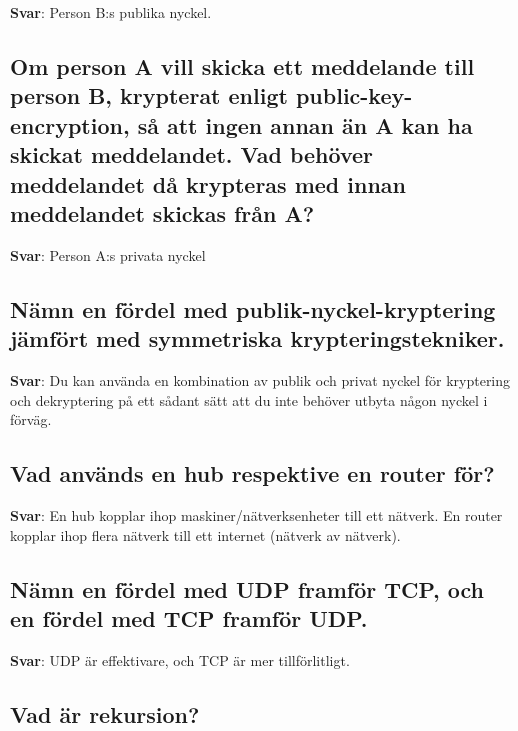 \documentclass[a4paper,11pt,oneside]{article}
\begin{document}
\begin{sloppypar}
\label{q:168:sa:sv:True}

\textbf{Svar}: Person B:s publika nyckel.



\subsection{Om person A vill skicka ett meddelande till person B, krypterat enligt public-key-encryption, s\r{a} att ingen annan \"an A kan ha skickat meddelandet. Vad beh\"over meddelandet d\r{a} krypteras med innan meddelandet skickas fr\r{a}n A?}

\label{q:169:sa:sv:True}

\textbf{Svar}: Person A:s privata nyckel



\subsection{N\"amn en f\"ordel med publik-nyckel-kryptering j\"amf\"ort med symmetriska krypteringstekniker.}

\label{q:170:sa:sv:True}

\textbf{Svar}: Du kan anv\"anda en kombination av publik och privat nyckel f\"or kryptering och dekryptering p\r{a} ett s\r{a}dant s\"att att du inte beh\"over utbyta n\r{a}gon nyckel i f\"orv\"ag.



\subsection{Vad anv\"ands en hub respektive en router f\"or?}

\label{q:171:sa:sv:True}

\textbf{Svar}: En hub kopplar ihop maskiner/n\"atverksenheter till ett n\"atverk. En router kopplar ihop flera n\"atverk till ett internet (n\"atverk av n\"atverk).



\subsection{N\"amn en f\"ordel med UDP framf\"or TCP, och en f\"ordel med TCP framf\"or UDP.}

\label{q:172:sa:sv:True}

\textbf{Svar}: UDP \"ar effektivare, och TCP \"ar mer tillf\"orlitligt.



\subsection{Vad \"ar rekursion?}


\end{sloppypar}
\end{document}
